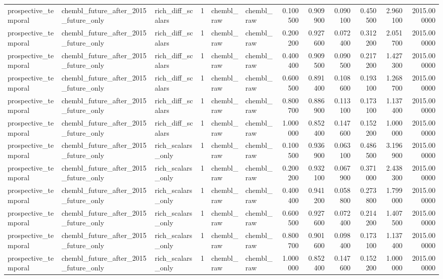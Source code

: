 \begin{longtable}{lllrllrrrrrr}
prospective\_temporal & chembl\_future\_after\_2015\_future\_only & rich\_diff\_scalars & 1 & chembl\_raw & chembl\_raw & 0.100500 & 0.909900 & 0.090100 & 0.450500 & 2.960100 & 2015.000000 \\
prospective\_temporal & chembl\_future\_after\_2015\_future\_only & rich\_diff\_scalars & 1 & chembl\_raw & chembl\_raw & 0.200200 & 0.927600 & 0.072400 & 0.312200 & 2.051700 & 2015.000000 \\
prospective\_temporal & chembl\_future\_after\_2015\_future\_only & rich\_diff\_scalars & 1 & chembl\_raw & chembl\_raw & 0.400400 & 0.909500 & 0.090500 & 0.217200 & 1.427300 & 2015.000000 \\
prospective\_temporal & chembl\_future\_after\_2015\_future\_only & rich\_diff\_scalars & 1 & chembl\_raw & chembl\_raw & 0.600500 & 0.891400 & 0.108600 & 0.193100 & 1.268700 & 2015.000000 \\
prospective\_temporal & chembl\_future\_after\_2015\_future\_only & rich\_diff\_scalars & 1 & chembl\_raw & chembl\_raw & 0.800700 & 0.886900 & 0.113100 & 0.173100 & 1.137400 & 2015.000000 \\
prospective\_temporal & chembl\_future\_after\_2015\_future\_only & rich\_diff\_scalars & 1 & chembl\_raw & chembl\_raw & 1.000000 & 0.852400 & 0.147600 & 0.152200 & 1.000000 & 2015.000000 \\
prospective\_temporal & chembl\_future\_after\_2015\_future\_only & rich\_scalars\_only & 1 & chembl\_raw & chembl\_raw & 0.100500 & 0.936900 & 0.063100 & 0.486500 & 3.196900 & 2015.000000 \\
prospective\_temporal & chembl\_future\_after\_2015\_future\_only & rich\_scalars\_only & 1 & chembl\_raw & chembl\_raw & 0.200200 & 0.932100 & 0.067900 & 0.371000 & 2.438300 & 2015.000000 \\
prospective\_temporal & chembl\_future\_after\_2015\_future\_only & rich\_scalars\_only & 1 & chembl\_raw & chembl\_raw & 0.400400 & 0.941200 & 0.058800 & 0.273800 & 1.799000 & 2015.000000 \\
prospective\_temporal & chembl\_future\_after\_2015\_future\_only & rich\_scalars\_only & 1 & chembl\_raw & chembl\_raw & 0.600500 & 0.927600 & 0.072400 & 0.214200 & 1.407500 & 2015.000000 \\
prospective\_temporal & chembl\_future\_after\_2015\_future\_only & rich\_scalars\_only & 1 & chembl\_raw & chembl\_raw & 0.800700 & 0.901600 & 0.098400 & 0.173100 & 1.137400 & 2015.000000 \\
prospective\_temporal & chembl\_future\_after\_2015\_future\_only & rich\_scalars\_only & 1 & chembl\_raw & chembl\_raw & 1.000000 & 0.852400 & 0.147600 & 0.152200 & 1.000000 & 2015.000000 \\

\end{longtable}
